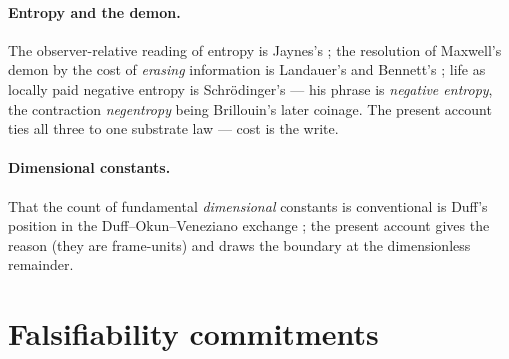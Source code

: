 \documentclass[11pt,a4paper]{article}
\theoremstyle{remark}\newtheorem{remark}[definition]{Remark}
\begin{document}
\paragraph{Entropy and the demon.} The observer-relative reading of entropy is
Jaynes's \citep{jaynes1957}; the resolution of Maxwell's demon by the cost of
\emph{erasing} information is Landauer's and Bennett's \citep{landauer1961,bennett1982}; life as
locally paid negative entropy is Schr\"odinger's \citep{schrodinger1944} --- his phrase is \emph{negative entropy}, the contraction
\emph{negentropy} being Brillouin's later coinage. The present
account ties all three to one substrate law --- cost is the write.

\paragraph{Dimensional constants.} That the count of fundamental \emph{dimensional}
constants is conventional is Duff's position in the Duff--Okun--Veneziano exchange
\citep{duff2002trialogue}; the present account gives the reason (they are frame-units) and
draws the boundary at the dimensionless remainder.

\section{Falsifiability commitments}\label{sec:falsifiability}
\end{document}
